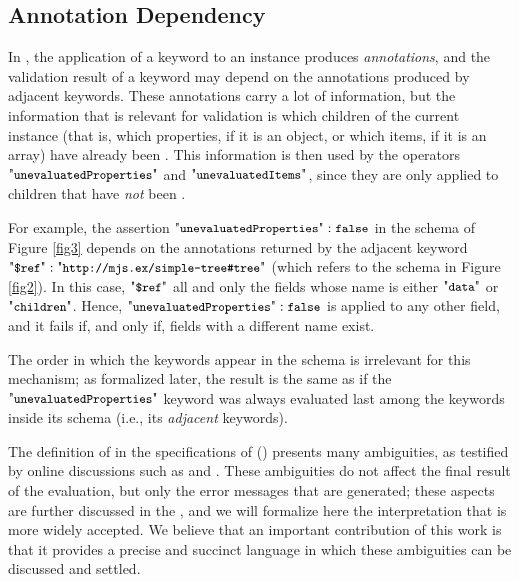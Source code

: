 \subsection{Annotation Dependency}\label{sec:annotations}

In {\mJS}, the application of a keyword to an instance produces \emph{annotations}, and the validation result of a keyword may
depend on the annotations
produced by adjacent keywords.
These annotations carry a lot of information, but the information that is relevant for validation is which
children of the current instance (that is, which properties, if it is an object, or which items, if it is an array)
have already been {\evaluated}.
This information is then used by the operators $\qunProps$ and $\qunIts$,
since they are only applied to children that have \emph{not}
been {\evaluated}. %

For example, the assertion $\qunProps: \afalse$ in the schema of Figure \ref{fig3} depends on the annotations returned
by the adjacent keyword $\qdref : \qkw{http://mjs.ex/simple-tree\#tree}$
(which refers to the schema in Figure \ref{fig2}).
In this case, $\qdref$ {\evaluates} all and only
the fields whose name is either $\qkw{data}$ or $\qkw{children}$. Hence, $\qunProps: \afalse$  is applied to any other field,
and it fails if, and only if, fields with a different name exist.

The order in which the keywords appear in the schema is irrelevant for this mechanism;
as formalized later, the result is the same as if the
$\qunProps$ keyword was always evaluated last among the keywords inside its schema (i.e., its \emph{adjacent}
keywords).



The definition of {\evaluated} in the specifications of {\DTwenty} (\citep{specs2020}) presents many ambiguities,
as testified by online discussions such as {\citeoneone} and {\citefiveseven}.
These ambiguities do not affect the final result of the evaluation, but only the error messages that are
generated; these aspects are further discussed in the {\FV}, and we will formalize here the interpretation that is more widely accepted.
We believe that an important contribution of this work is that it provides a precise and succinct language
in which these ambiguities can be discussed and settled.




